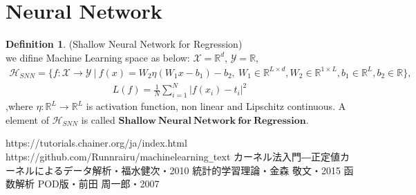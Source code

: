 \documentclass[11pt, a4paper, english, dvipdfmx]{jsarticle}
\theoremstyle{definition}
\newtheorem{Definition+}[Axiom+]{Definition}
\newcommand{\R}{\mathbb{R}}
\newcommand{\X}{\mathcal{X}}
\newcommand{\Y}{\mathcal{Y}}
\newcommand{\Hil}{\mathcal{H}}
\begin{document}
\section{Neural Network}
\begin{Definition+}(Shallow Neural Network for Regression)\\
    we difine Machine Learning space as below: $\X = \R^{d}$, $\Y = \R$,
    \begin{align*}
        \Hil_{SNN} = \{f:\X\to\Y~|~ f(x) = W_{2} \eta\left(W_{1} x-b_{1}\right) - b_{2},~W_{1} \in \R^{L \times d}, W_{2} \in \R^{1 \times L}, b_{1} \in \R^{L}, b_{2}\in\R\},
    \end{align*}
    \begin{align*}
        L(f) =  \frac{1}{N}\sum_{i = 1}^{N} |f(x_{i}) - t_{i}|^{2}
    \end{align*}
    ,where $\eta:\R^{L}\to\R^{L}$ is activation function, non linear and  Lipschitz continuous.
    A element of $\Hil_{SNN}$ is called $\mathbf{Shallow~Neural~Network~for~Regression}$.
\end{Definition+}
\begin{thebibliography}{9}
     https://tutorials.chainer.org/ja/index.html
     https://github.com/Runnrairu/machinelearning\verb|_|text
     カーネル法入門―正定値カーネルによるデータ解析・福水健次・2010
     統計的学習理論・金森 敬文・2015
     函数解析 POD版・前田 周一郎・2007
\end{thebibliography}
\end{document}
